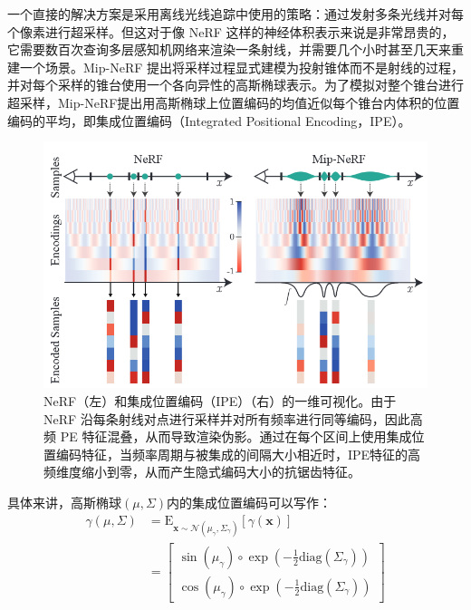 一个直接的解决方案是采用离线光线追踪中使用的策略：通过发射多条光线并对每个像素进行超采样。但这对于像 NeRF 这样的神经体积表示来说是非常昂贵的，它需要数百次查询多层感知机网络来渲染一条射线，并需要几个小时甚至几天来重建一个场景。Mip-NeRF \cite{barron_mip-nerf_2021}提出将采样过程显式建模为投射锥体而不是射线的过程，并对每个采样的锥台使用一个各向异性的高斯椭球表示。为了模拟对整个锥台进行超采样，Mip-NeRF提出用高斯椭球上位置编码的均值近似每个锥台内体积的位置编码的平均，即集成位置编码（Integrated Positional Encoding，IPE）。
\begin{figure}[h]
    \centering
    \includegraphics[width=\textwidth]{undergraduate-thesis/images/related-work/mipnerf-encoding.png}
    \caption{NeRF（左）和集成位置编码（IPE）（右）的一维可视化。由于 NeRF 沿每条射线对点进行采样并对所有频率进行同等编码，因此高频 PE 特征混叠，从而导致渲染伪影。通过在每个区间上使用集成位置编码特征，当频率周期与被集成的间隔大小相近时，IPE特征的高频维度缩小到零，从而产生隐式编码大小的抗锯齿特征。}
    \label{fig:related-work mip-nerf encoding}
\end{figure}

具体来讲，高斯椭球$(\mu,\Sigma)$内的集成位置编码可以写作：
\begin{align}
    \gamma(\mu,\Sigma) &= \text{E}_{\mathbf{x}\sim\mathcal{N}(\mu_\gamma,\Sigma_\gamma)}[\gamma(\mathbf{x})] \\
    &= \begin{bmatrix}
    \sin(\mu_\gamma)\circ\exp(-\frac{1}{2}\text{diag}(\Sigma_\gamma))\\
    \cos(\mu_\gamma)\circ\exp(-\frac{1}{2}\text{diag}(\Sigma_\gamma))
    \end{bmatrix}
\end{align}

